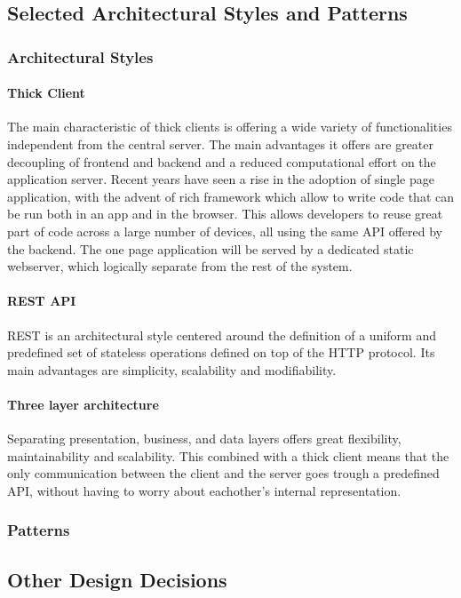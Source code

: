 \subsection{Selected Architectural Styles and Patterns}
\subsubsection{Architectural Styles}
\paragraph{Thick Client}
The main characteristic of thick clients is offering a wide variety of functionalities independent from the central server.
The main advantages it offers are greater decoupling of frontend and backend and a reduced computational effort on the application server.
Recent years have seen a rise in the adoption of single page application, with the advent of rich framework which allow to write code that can be run both in an app and in the browser.
This allows developers to reuse great part of code across a large number of devices, all using the same API offered by the backend.
The one page application will be served by a dedicated static webserver, which logically separate from the rest of the system.

\paragraph{REST API}
REST is an architectural style centered around the definition of a uniform and predefined set of stateless operations defined on top of the HTTP protocol.
Its main advantages are simplicity, scalability and modifiability.

\paragraph{Three layer architecture}
Separating presentation, business, and data layers offers great flexibility, maintainability and scalability.
This combined with a thick client means that the only communication between the client and the server goes trough a predefined API, without having to worry about eachother's internal representation.

\subsubsection{Patterns}

\subsection{Other Design Decisions}
